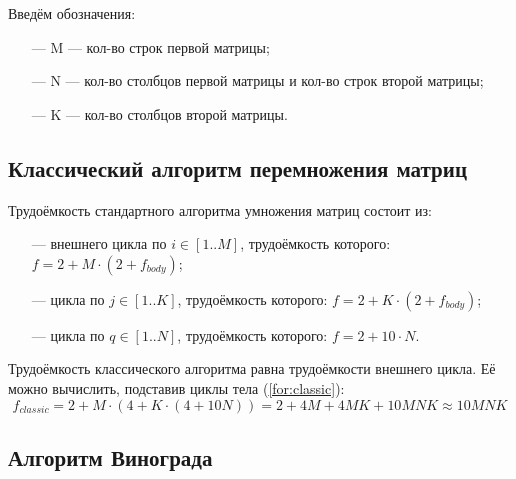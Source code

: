Введём обозначения:
\begin{itemize}
	\item[---] M --- кол-во строк первой матрицы;
	\item[---] N --- кол-во столбцов первой матрицы и кол-во строк второй матрицы;
	\item[---] K --- кол-во столбцов второй матрицы.
\end{itemize}

\subsection{Классический алгоритм перемножения матриц}

Трудоёмкость стандартного алгоритма умножения матриц состоит из:

\begin{itemize}
	\item[---] внешнего цикла по $i \in [1..M]$, трудоёмкость которого: $f = 2 + M \cdot (2 + f_{body})$;
	\item[---] цикла по $j \in [1..K]$, трудоёмкость которого: $f = 2 + K \cdot (2 + f_{body})$;
	\item[---] цикла по $q \in [1..N]$, трудоёмкость которого: $f = 2 + 10 \cdot N$.
\end{itemize}

Трудоёмкость классического алгоритма равна трудоёмкости внешнего цикла.
Её можно вычислить, подставив циклы тела (\ref{for:classic}):
\begin{equation}
	\label{for:classic}
	f_{classic} = 2 + M \cdot (4 + K \cdot (4 + 10N)) = 2 + 4M + 4MK + 10MNK \approx 10MNK
\end{equation}

\subsection{Алгоритм Винограда}

